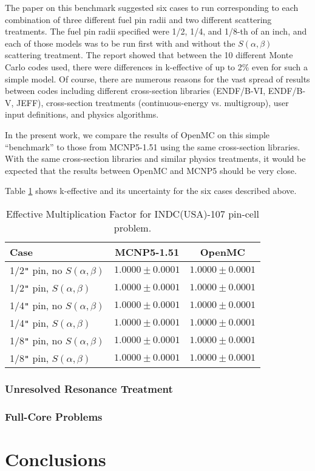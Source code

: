 \documentclass{elsarticle}
\begin{document}
The paper on this benchmark suggested six cases to run corresponding to each
combination of three different fuel pin radii and two different scattering
treatments. The fuel pin radii specified were 1/2, 1/4, and 1/8-th of an inch,
and each of those models was to be run first with and without the
$S(\alpha,\beta)$ scattering treatment. The report showed that between the 10
different Monte Carlo codes used, there were differences in k-effective of up to
2\% even for such a simple model. Of course, there are numerous reasons for the
vast spread of results between codes including different cross-section libraries
(ENDF/B-VI, ENDF/B-V, JEFF), cross-section treatments (continuous-energy
vs. multigroup), user input definitions, and physics algorithms.

In the present work, we compare the results of OpenMC on this simple
``benchmark'' to those from MCNP5-1.51 using the same cross-section
libraries. With the same cross-section libraries and similar physics treatments,
it would be expected that the results between OpenMC and MCNP5 should be very
close.

Table \ref{tab:pincell} shows k-effective and its uncertainty for the six cases
described above.

\begin{table}
  \caption{Effective Multiplication Factor for INDC(USA)-107 pin-cell problem.}
  \label{tab:pincell}
  \begin{center}
  \begin{tabular}{ l c c }
    \hline
    Case & MCNP5-1.51 & OpenMC \\
    \hline
    1/2\verb+"+ pin, no $S(\alpha,\beta)$ & $1.0000 \pm 0.0001$ & $1.0000 \pm 0.0001$ \\
    1/2\verb+"+ pin, $S(\alpha,\beta)$    & $1.0000 \pm 0.0001$ & $1.0000 \pm 0.0001$ \\
    1/4\verb+"+ pin, no $S(\alpha,\beta)$ & $1.0000 \pm 0.0001$ & $1.0000 \pm 0.0001$ \\
    1/4\verb+"+ pin, $S(\alpha,\beta)$    & $1.0000 \pm 0.0001$ & $1.0000 \pm 0.0001$ \\
    1/8\verb+"+ pin, no $S(\alpha,\beta)$ & $1.0000 \pm 0.0001$ & $1.0000 \pm 0.0001$ \\
    1/8\verb+"+ pin, $S(\alpha,\beta)$    & $1.0000 \pm 0.0001$ & $1.0000 \pm 0.0001$ \\
    \hline
  \end{tabular}
  \end{center}
\end{table}

\subsubsection{Unresolved Resonance Treatment}

\subsubsection{Full-Core Problems}

\section{Conclusions}



\end{document}
